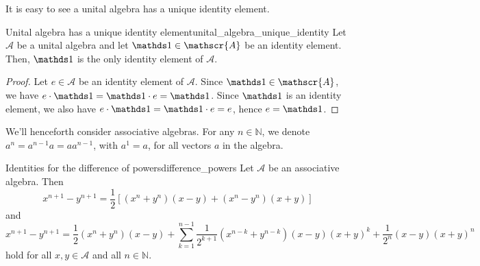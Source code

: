 It is easy to see a unital algebra has a unique identity element.
\begin{proposition}{Unital algebra has a unique identity element}{unital_algebra_unique_identity}
    Let \(\mathscr{A}\) be a unital algebra and let \(\unity \in \mathscr{A}\) be an identity element. Then, \(\unity\) is the only identity element of \(\mathscr{A}\).
\end{proposition}
\begin{proof}
    Let \(e \in \mathscr{A}\) be an identity element of \(\mathscr{A}\). Since \(\unity \in \mathscr{A}\), we have \(e \cdot \unity = \unity \cdot e = \unity\). Since \(\unity\) is an identity element, we also have \(e \cdot \unity = \unity \cdot e = e\), hence \(e = \unity\).
\end{proof}

We'll henceforth consider associative algebras. For any \(n \in \mathbb{N}\), we denote \(a^n = a^{n-1}a = aa^{n-1}\), with \(a^1 = a\), for all vectors \(a\) in the algebra.
\begin{proposition}{Identities for the difference of powers}{difference_powers}
    Let \(\mathscr{A}\) be an associative algebra. Then
    \begin{equation*}
        x^{n+1} - y^{n+1} = \frac12 \left[(x^n + y^n)(x - y) + (x^n - y^n)(x+y)\right]
    \end{equation*}
    and
    \begin{equation*}
        x^{n+1} - y^{n+1} = \frac12(x^n + y^n)(x-y) + \sum_{k=1}^{n-1}\frac{1}{2^{k+1}}(x^{n-k}+y^{n-k})(x-y)(x+y)^k + \frac1{2^n}(x - y)(x+y)^n
    \end{equation*}
    hold for all \(x,y \in \mathscr{A}\) and all \(n \in \mathbb{N}\).
\end{proposition}
